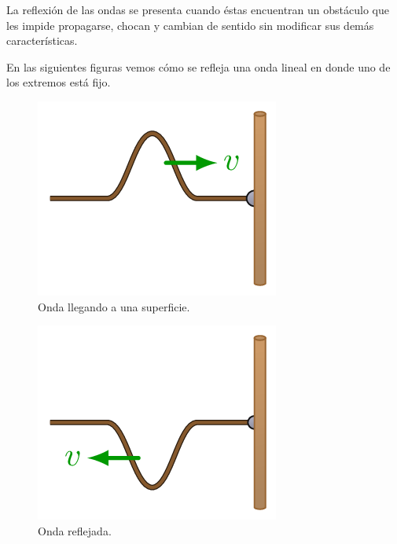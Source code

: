 \documentclass[12pt, letter]{article}
\begin{document}
La reflexión de las ondas se presenta cuando éstas encuentran un obstáculo que les impide propagarse,  chocan y cambian de sentido sin modificar sus demás características.

En las siguientes figuras vemos cómo se refleja una onda lineal en donde uno de los extremos está fijo.
\begin{figure}[H]
    \centering
    \includegraphics[scale=0.7]{Imagenes/Reflexion_Ondas_01.png}
    \caption{Onda llegando a una superficie.}
\end{figure}
\begin{figure}[H]
    \centering
    \includegraphics[scale=0.7]{Imagenes/Reflexion_Ondas_02.png}
    \caption{Onda reflejada.}
\end{figure}
\end{document}
